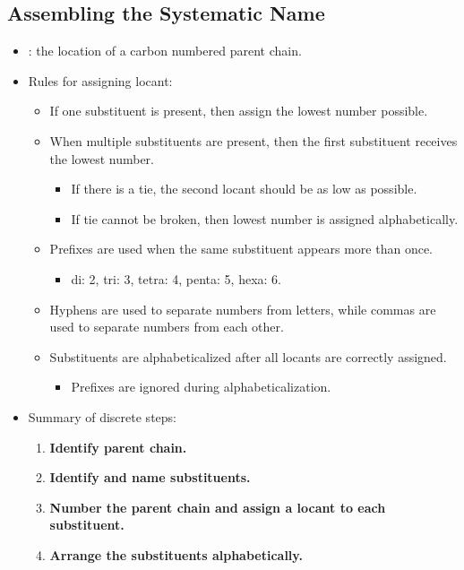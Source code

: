 \documentclass{inVerba-notes}
\begin{document}
\begin{itemize}
    \subsection{Assembling the Systematic Name}
    \begin{itemize}
        \item {}: the location of a carbon numbered parent chain.
        \item Rules for assigning locant:
            \begin{itemize}
                \item If one substituent is present, then assign the lowest number possible.
                \item When multiple substituents are present, then the first substituent receives the lowest number. 
                    \begin{itemize}
                        \item If there is a tie, the second locant should be as low as possible.
                        \item If tie cannot be broken, then lowest number is assigned alphabetically.
                    \end{itemize}
                \item Prefixes are used when the same substituent appears more than once. 
                    \begin{itemize}
                        \item di: 2, tri: 3, tetra: 4, penta: 5, hexa: 6.
                    \end{itemize}
                \item Hyphens are used to separate numbers from letters, while commas are used to separate numbers from each other.
                \item Substituents are alphabeticalized after all locants are correctly assigned.
                    \begin{itemize}
                        \item Prefixes are ignored during alphabeticalization.
                    \end{itemize}
            \end{itemize}
        \item Summary of discrete steps:
            \begin{enumerate}
                \item \textbf{Identify parent chain.}
                \item \textbf{Identify and name substituents.}
                \item \textbf{Number the parent chain and assign a locant to each substituent.}
                \item \textbf{Arrange the substituents alphabetically.}
            \end{enumerate}
    \end{itemize}
\end{itemize}
\end{document}
